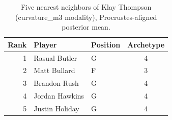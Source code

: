 \begin{table}[htbp]
  \centering\small
  \begin{tabular}{rllc}
    \toprule
    Rank & Player & Position & Archetype \\
    \midrule
    1 & Rasual Butler & G & 4 \\
    2 & Matt Bullard & F & 3 \\
    3 & Brandon Rush & G & 4 \\
    4 & Jordan Hawkins & G & 4 \\
    5 & Justin Holiday & G & 4 \\
    \bottomrule
  \end{tabular}
  \caption{Five nearest neighbors of Klay Thompson (curvature_m3 modality), Procrustes-aligned posterior mean.}
  \label{tab:Klay_Thompson_neighbors_curvature_m3}
\end{table}

